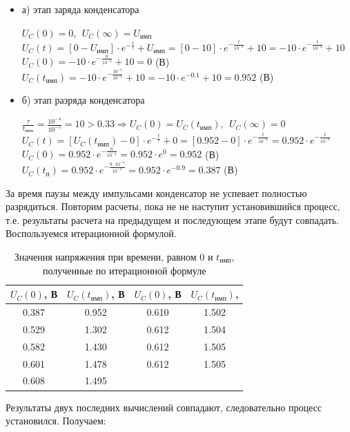 \begin{itemize}
\item[] а) этап заряда конденсатора

		$U_C(0) = 0,\ \ U_C(\infty) = U_\text{имп}$\\	
		$U_C(t) = [0 - U_\text{имп}] \cdot e^{-\frac{t}{\tau}} + U_\text{имп} = [0 - 10] \cdot e^{-\frac{t}{10^{-4}}} + 10 = -10 \cdot e^{-\frac{t}{10^{-4}}} + 10$\\
		$U_C(0) = -10 \cdot e^{-\frac{0}{10^{-4}}} + 10 = 0$ (В)\\
		$U_C(t_\text{имп}) = -10 \cdot e^{-\frac{10^{-5}}{10^{-4}}} + 10 = -10 \cdot e^{-0.1} + 10 = 0.952$ (В)\\
		
\item[] б) этап разряда конденсатора
	
		$\frac{\tau}{t_\text{имп}} = \frac{10^{-4}}{10^{-5}} = 10 > 0.33 \Rightarrow U_C(0) = U_C(t_\text{имп}),\ \ U_C(\infty) = 0$\\
		$U_C(t) = [U_C(t_\text{имп}) - 0] \cdot e^{-\frac{t}{\tau}} + 0 =  [0.952 - 0] \cdot e^{-\frac{t}{10^{-4}}} = 0.952 \cdot e^{-\frac{t}{10^{-4}}}$\\
		$U_C(0) = 0.952 \cdot e^{-\frac{0}{10^{-4}}} = 0.952 \cdot e^0 = 0.952$ (В)\\
		$U_C(t_\text{п}) = 0.952 \cdot e^{-\frac{9 \cdot 10^{-5}}{10^{-4}}} = 0.952 \cdot e^{-0.9} = 0.387$ (В)\\
		
\end{itemize}

	За время паузы между импульсами конденсатор не успевает полностью разрядиться. Повторим расчеты, пока не не наступит установившийся процесс, т.е. результаты расчета на предыдущем и последующем этапе будут совпадать. Воспользуемся итерационной формулой.
\begin{table}[H]

	\begin{center}
	\caption{Значения напряжения при времени, равном $0$ и $t_\text{имп}$, полученные по итерационной формуле}
	\def\arraystretch{1.2}
	\begin{tabular}{|c|c||c|c|}
		\hline 
		$U_C(0)$, В & $U_C(t_\text{имп})$, В & $U_C(0)$, В & $U_C(t_\text{имп})$, \\ 
		\hline 
		0.387 & 0.952 & 0.610 & 1.502 \\
		\hline 
		0.529 & 1.302 & 0.612 & 1.504 \\
		\hline 
		0.582 & 1.430 & 0.612 & 1.505 \\ 
		\hline 
		0.601 & 1.478 & 0.612 & 1.505 \\
		\hline 
		0.608 & 1.495 & & \\
		\hline 
		\end{tabular} 	
		
	\end{center}
\end{table}
	Результаты двух последних вычислений совпадают, следовательно процесс установился. Получаем:
	
